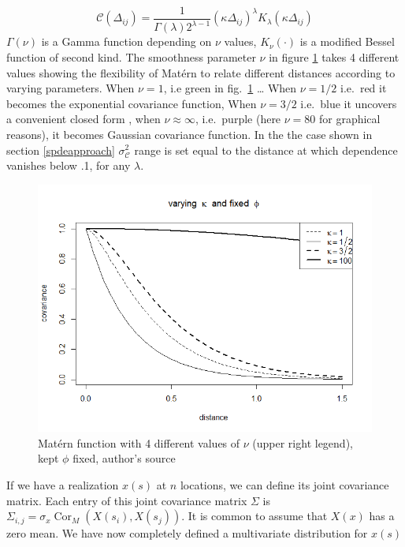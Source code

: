 \documentclass[
  12pt,
  a4paper,
  oneside]{book}
\theoremstyle{definition}
\theoremstyle{definition}
\theoremstyle{definition}
\theoremstyle{remark}
\begin{document}
\[
\mathscr{C}\left(\Delta_{i j}\right)=\frac{1}{\Gamma(\lambda) 2^{\lambda-1}}\left(\kappa \Delta_{i j}\right)^{\lambda} K_{\lambda}\left(\kappa \Delta_{i j}\right)
\]
\(\Gamma(\nu)\) is a Gamma function depending on \(\nu\) values, \(K_{\nu}(\cdot)\) is a modified Bessel function of second kind. The smoothness parameter \(\nu\) in figure \ref{fig:matern} takes 4 different values showing the flexibility of Matérn to relate different distances according to varying parameters. When \(\nu = 1\), i.e green in fig.~\ref{fig:matern} \ldots{} When \(\nu = 1/2\) i.e.~red it becomes the exponential covariance function, When \(\nu = 3/2\) i.e.~blue it uncovers a convenient closed form \citep{LecturePaci}, when \(\nu \approx \infty\), i.e.~purple (here \(\nu = 80\) for graphical reasons), it becomes Gaussian covariance function. In the the case shown in section \ref{spdeapproach} \(\sigma_{\mathscr{C}}^{2}\) range is set equal to the distance at which dependence vanishes below .1, for any \(\lambda\).

\begin{figure}
\centering
\includegraphics{images/matern.png}
\caption{\label{fig:matern}Matérn function with 4 different values of \(\nu\) (upper right legend), kept \(\phi\) fixed, author's source}
\end{figure}

If we have a realization \(x(s)\) at \(n\) locations, we can define its joint covariance matrix. Each entry of this joint covariance matrix \(\Sigma\) is \(\Sigma_{i, j}=\sigma_{x} \operatorname{Cor}_{M}\left(X\left(s_{i}\right), X\left(s_{j}\right)\right)\). It is common to assume that \(X(x)\) has a zero mean. We have now completely defined a multivariate distribution for \(x(s)\)
\end{document}
